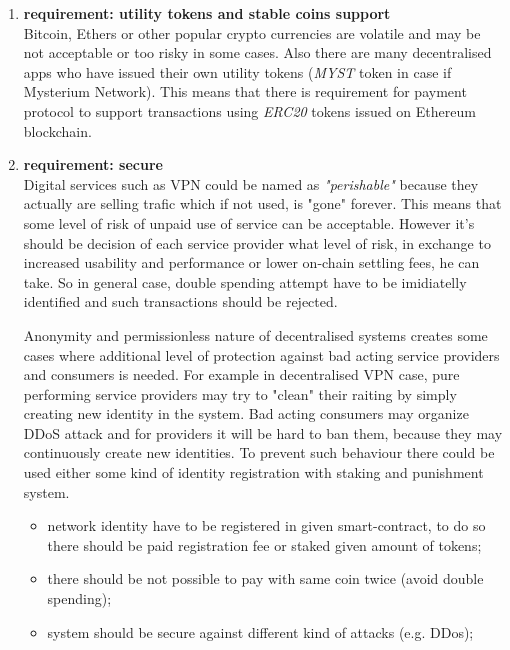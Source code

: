 \documentclass[a4paper,12pt]{article}
\begin{document}
\begin{enumerate}
    \item \textbf{requirement: utility tokens and stable coins support}\\
    Bitcoin, Ethers or other popular crypto currencies are volatile and may be 
    not acceptable or too risky in some cases. Also there are many decentralised
    apps who have issued their own utility tokens (\textit{MYST} token in case
    if Mysterium Network). This means that there is requirement for payment 
    protocol to support transactions using \textit{ERC20} tokens issued on 
    Ethereum blockchain.

    \item \textbf{requirement: secure}\\
    Digital services such as VPN could be named as \textit{"perishable"} because 
    they actually are selling trafic which if not used, is "gone" forever. This 
    means that some level of risk of unpaid use of service can be acceptable. 
    However it's should be decision of each service provider what level of risk, 
    in exchange to increased usability and performance or lower on-chain 
    settling fees, he can take. So in general case, double spending attempt have 
    to be imidiatelly identified and such transactions should be rejected.

    Anonymity and permissionless nature of decentralised systems creates some 
    cases where additional level of protection against bad acting service 
    providers and consumers is needed. For example in decentralised VPN case, 
    pure performing service providers may try to "clean" their raiting by simply 
    creating new identity in the system. Bad acting consumers may organize DDoS 
    attack and for providers it will be hard to ban them, because they may 
    continuously create new identities. To prevent such behaviour there could be 
    used either some kind of identity registration with staking and punishment 
    system.

    \begin{itemize}
        \item network identity have to be registered in given smart-contract, to
        do so there should be paid registration fee or staked given amount of 
        tokens;
        \item there should be not possible to pay with same coin twice (avoid 
        double spending);
        \item system should be secure against different kind of attacks (e.g. 
        DDos);
    \end{itemize}


\end{enumerate}
\end{document}
